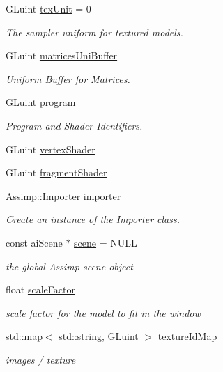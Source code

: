 \begin{DoxyCompactItemize}
\item 
G\-Luint \hyperlink{model_8cu_a97e30e3db0b913943abcd0dc575ace53}{tex\-Unit} = 0
\begin{DoxyCompactList}\small\item\em The sampler uniform for textured models. \end{DoxyCompactList}\item 
G\-Luint \hyperlink{model_8cu_a9d18a0bfeca34c0908d4383cff3506d1}{matrices\-Uni\-Buffer}
\begin{DoxyCompactList}\small\item\em Uniform Buffer for Matrices. \end{DoxyCompactList}\item 
G\-Luint \hyperlink{model_8cu_a27d8510c93324412d38a888eddee2852}{program}
\begin{DoxyCompactList}\small\item\em Program and Shader Identifiers. \end{DoxyCompactList}\item 
G\-Luint \hyperlink{model_8cu_aff4cf7548dc507a02192ad289d424873}{vertex\-Shader}
\item 
G\-Luint \hyperlink{model_8cu_ac6199bad53ba5a784194f0d6a86a1758}{fragment\-Shader}
\item 
Assimp\-::\-Importer \hyperlink{model_8cu_acc60f07ef610a395e60c056a6ceac291}{importer}
\begin{DoxyCompactList}\small\item\em Create an instance of the Importer class. \end{DoxyCompactList}\item 
const ai\-Scene $\ast$ \hyperlink{model_8cu_a7146d7f6682223a83b571071845d75e9}{scene} = N\-U\-L\-L
\begin{DoxyCompactList}\small\item\em the global Assimp scene object \end{DoxyCompactList}\item 
float \hyperlink{model_8cu_a8030f24154c0e29bcbdf9a153804f214}{scale\-Factor}
\begin{DoxyCompactList}\small\item\em scale factor for the model to fit in the window \end{DoxyCompactList}\item 
std\-::map$<$ std\-::string, G\-Luint $>$ \hyperlink{model_8cu_a531fe6af3b950c3a770ea91117a9b24f}{texture\-Id\-Map}
\begin{DoxyCompactList}\small\item\em images / texture \end{DoxyCompactList}\item 

\end{DoxyCompactItemize}
